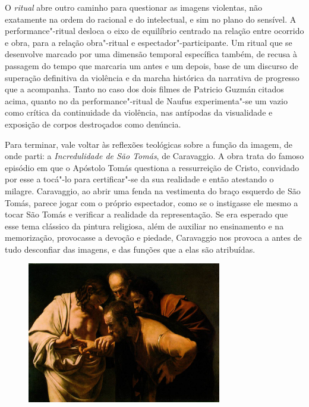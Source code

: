 O \emph{ritual} abre outro caminho para questionar as imagens violentas,
não exatamente na ordem do racional e do intelectual, e sim no plano do
sensível. A performance"-ritual desloca o eixo de equilíbrio centrado na
relação entre ocorrido e obra, para a relação obra"-ritual e
espectador"-participante. Um ritual que se desenvolve marcado por uma
dimensão temporal específica também, de recusa à passagem do tempo que
marcaria um antes e um depois, base de um discurso de superação definitiva da
violência e da marcha histórica da narrativa de progresso que a
acompanha. Tanto no caso dos dois filmes de Patricio Guzmán citados
acima, quanto no da performance"-ritual de Naufus experimenta"-se um vazio
como crítica da continuidade da violência, nas antípodas da visualidade
e exposição de corpos destroçados como denúncia.

\asterisc

Para terminar, vale voltar às reflexões teológicas sobre a função da
imagem, de onde parti: a \emph{Incredulidade de São Tomás}, de
Caravaggio. A obra trata do famoso episódio em que o Apóstolo Tomás
questiona a ressurreição de Cristo, convidado por esse a tocá"-lo para
certificar"-se da sua realidade e então atestando o milagre. Caravaggio,
ao abrir uma fenda na vestimenta do braço esquerdo de São Tomás, parece
jogar com o próprio espectador, como se o instigasse ele mesmo a tocar São
Tomás e verificar a realidade da representação. Se era esperado que esse
tema clássico da pintura religiosa, além de auxiliar no ensinamento e na
memorização, provocasse a devoção e piedade, Caravaggio nos provoca a
antes de tudo desconfiar das imagens, e das funções que a elas são
atribuídas.

\begin{figure}[!ht]
\centering
 \includegraphics[width=85mm]{./imgs/crer.png}
\caption{\tiny{}}
\end{figure}

